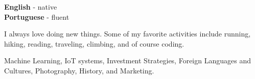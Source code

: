 \documentclass[9pt]{developercv} %
\begin{document}

\begin{minipage}[t]{0.3\textwidth}
	\vspace{-\baselineskip} %


	\textbf{English} - native \\
	\textbf{Portuguese} - fluent
\end{minipage}
\hfill
\begin{minipage}[t]{0.3\textwidth}
	\vspace{-\baselineskip} %
	

	I always love doing new things. 
	Some of my favorite activities include running, hiking, reading, 
	traveling, climbing, and of course coding.
	
\end{minipage}
\hfill
\begin{minipage}[t]{0.3\textwidth}
	\vspace{-\baselineskip} %
	

	Machine Learning, 
	IoT systems, Investment Strategies, Foreign Languages and Cultures, 
	Photography, History, and Marketing. 
	
\end{minipage}

\end{document}
